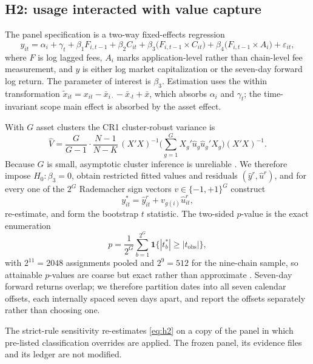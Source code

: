 \documentclass[10pt]{article}
\begin{document}
\subsection{H2: usage interacted with value capture}
The panel specification is a two-way fixed-effects regression
\begin{equation}
y_{it} = \alpha_i + \gamma_t + \beta_1 F_{i,t-1} + \beta_2 C_{it} + \beta_3\big(F_{i,t-1} \times C_{it}\big) + \beta_4\big(F_{i,t-1} \times A_i\big) + \varepsilon_{it},
\label{eq:h2}
\end{equation}
where $F$ is log lagged fees, $A_i$ marks application-level rather than chain-level fee measurement, and $y$ is either log market capitalization or the seven-day forward log return. The parameter of interest is $\beta_3$. Estimation uses the within transformation $\tilde{x}_{it} = x_{it} - \bar{x}_{i\cdot} - \bar{x}_{\cdot t} + \bar{x}$, which absorbs $\alpha_i$ and $\gamma_t$; the time-invariant scope main effect is absorbed by the asset effect.

With $G$ asset clusters the CR1 cluster-robust variance is
\begin{equation}
\widehat{V} = \frac{G}{G-1}\cdot\frac{N-1}{N-K}\,(X'X)^{-1}\Big(\sum_{g=1}^{G} X_g'\hat{u}_g\hat{u}_g'X_g\Big)(X'X)^{-1}.
\end{equation}
Because $G$ is small, asymptotic cluster inference is unreliable \citep{cameron2008bootstrap,mackinnonwebb2017}. We therefore impose $H_0:\beta_3=0$, obtain restricted fitted values and residuals $(\hat{y}^r,\hat{u}^r)$, and for every one of the $2^G$ Rademacher sign vectors $v \in \{-1,+1\}^G$ construct
\begin{equation}
y^*_{it} = \hat{y}^r_{it} + v_{g(i)}\hat{u}^r_{it},
\end{equation}
re-estimate, and form the bootstrap $t$ statistic. The two-sided $p$-value is the exact enumeration
\begin{equation}
p = \frac{1}{2^G}\sum_{b=1}^{2^G}\mathbf{1}\{|t^*_b| \ge |t_{\mathrm{obs}}|\},
\end{equation}
with $2^{11}=2048$ assignments pooled and $2^{9}=512$ for the nine-chain sample, so attainable $p$-values are coarse but exact rather than approximate \citep{roodman2019boottest}. Seven-day forward returns overlap; we therefore partition dates into all seven calendar offsets, each internally spaced seven days apart, and report the offsets separately rather than choosing one.

The strict-rule sensitivity re-estimates \eqref{eq:h2} on a copy of the panel in which pre-listed classification overrides are applied. The frozen panel, its evidence files and its ledger are not modified.
\end{document}
